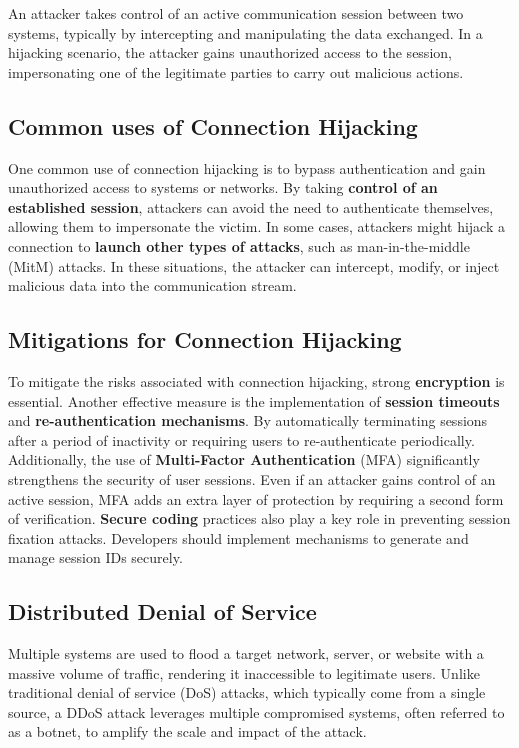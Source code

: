 An attacker takes control of an active communication session between two systems, typically by intercepting and manipulating the data exchanged. In a hijacking scenario, the attacker gains unauthorized access to the session, impersonating one of the legitimate parties to carry out malicious actions.

\subsection{Common uses of Connection Hijacking}
One common use of connection hijacking is to bypass authentication and gain unauthorized access to systems or networks. By taking \textbf{control of an established session}, attackers can avoid the need to authenticate themselves, allowing them to impersonate the victim. In some cases, attackers might hijack a connection to \textbf{launch other types of attacks}, such as man-in-the-middle (MitM) attacks. In these situations, the attacker can intercept, modify, or inject malicious data into the communication stream.

\subsection{Mitigations for Connection Hijacking}
To mitigate the risks associated with connection hijacking, strong \textbf{encryption} is essential. Another effective measure is the implementation of \textbf{session timeouts} and \textbf{re-authentication mechanisms}. By automatically terminating sessions after a period of inactivity or requiring users to re-authenticate periodically. Additionally, the use of \textbf{Multi-Factor Authentication} (MFA) significantly strengthens the security of user sessions. Even if an attacker gains control of an active session, MFA adds an extra layer of protection by requiring a second form of verification. \textbf{Secure coding} practices also play a key role in preventing session fixation attacks. Developers should implement mechanisms to generate and manage session IDs securely. 

\begin{center}
    \section{Distributed Denial of Service}
\end{center}
Multiple systems are used to flood a target network, server, or website with a massive volume of traffic, rendering it inaccessible to legitimate users. Unlike traditional denial of service (DoS) attacks, which typically come from a single source, a DDoS attack leverages multiple compromised systems, often referred to as a botnet, to amplify the scale and impact of the attack.

